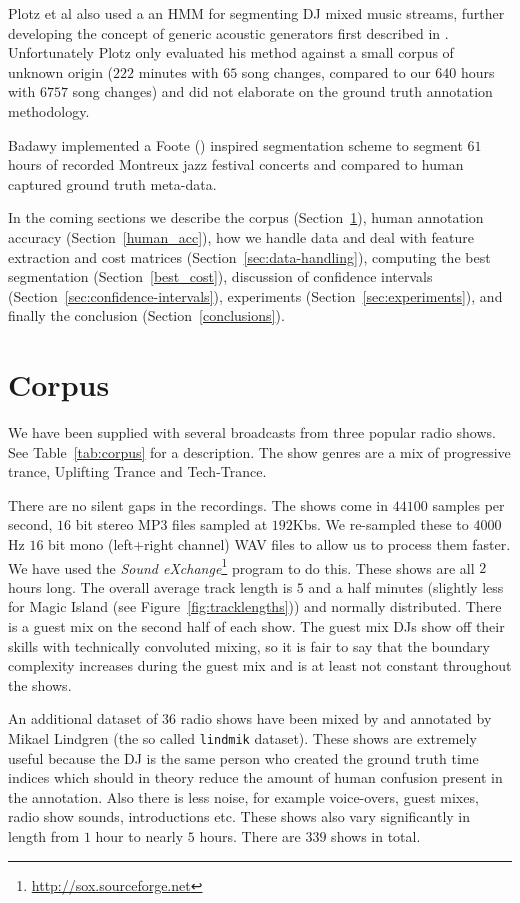 \documentclass[twocolumn]{article}
\begin{document}
	Plotz et al also used a an HMM for segmenting DJ mixed music streams, further developing the concept of generic acoustic generators first described in \citep{batlle2002automatic}. Unfortunately Plotz only evaluated his method against a small corpus of unknown origin ($222$ minutes with $65$ song changes, compared to our $640$ hours with $6757$ song changes) and did not elaborate on the ground truth annotation methodology. 
	
	Badawy implemented a Foote (\citep{foote2003media}) inspired segmentation scheme to segment $61$ hours of recorded Montreux jazz festival concerts and compared to human captured ground truth meta-data. 
	
	In the coming sections we describe the corpus (Section~\ref{dataset}), human annotation accuracy (Section~\ref{human_acc}), how we handle data and deal with feature extraction and cost matrices (Section~\ref{sec:data-handling}), computing the best segmentation (Section~\ref{best_cost}), discussion of confidence intervals (Section~\ref{sec:confidence-intervals}), experiments (Section~\ref{sec:experiments}), and finally the conclusion (Section~\ref{conclusions}).
	
	\section{Corpus}\label{dataset}
	
	We have been supplied with several broadcasts from three popular radio shows. See Table~\ref{tab:corpus} for a description. The show genres are a mix of progressive trance, Uplifting Trance and Tech-Trance. 
	
	There are no silent gaps in the recordings. The shows come in $44100$ samples per second, $16$ bit stereo MP3 files sampled at $192$Kbs. We re-sampled these to $4000$Hz $16$ bit mono (left+right channel) WAV files to allow us to process them faster. We have used the \textit{Sound eXchange}\footnote{\url{http://sox.sourceforge.net}} program to do this. These shows are all $2$ hours long. The overall average track length is $5$ and a half minutes (slightly less for Magic Island (see Figure~\ref{fig:tracklengths})) and normally distributed.  There is a guest mix on the second half of each show. The guest mix DJs show off their skills with technically convoluted mixing, so it is fair to say that the boundary complexity increases during the guest mix and is at least not constant throughout the shows.
	
	An additional dataset of $36$ radio shows have been mixed by and annotated by Mikael Lindgren (the so called \texttt{lindmik} dataset). These shows are extremely useful because the DJ is the same person who created the ground truth time indices which should in theory reduce the amount of human confusion present in the annotation. Also there is less noise, for example voice-overs, guest mixes, radio show sounds, introductions etc. These shows also vary significantly in length from $1$ hour to nearly $5$ hours. There are $339$ shows in total.
	
\end{document}
